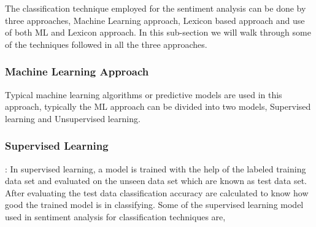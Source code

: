\documentclass[sigconf]{acmart}
\begin{document}
The classification technique employed for the sentiment analysis can be done by three approaches, Machine Learning approach, Lexicon based approach and use of both ML and Lexicon approach. In this sub-section we will walk through some of the techniques followed in all the three approaches.

\subsubsection{Machine Learning Approach}
Typical machine learning algorithms or predictive models are used in this approach, typically the ML approach can be divided into two models, Supervised learning and Unsupervised learning. 
\subsubsection*{Supervised Learning} : In supervised learning, a model is trained with the help of the labeled training data set and evaluated on the unseen data set which are known as test data set. After evaluating the test data classification accuracy are calculated to know how good the trained model is in classifying. Some of the supervised learning model used in sentiment analysis for classification techniques are,
\end{document}
